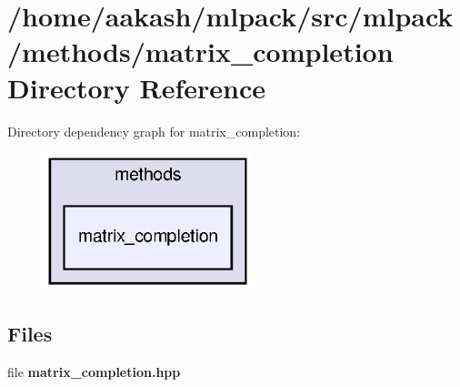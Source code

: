 \section{/home/aakash/mlpack/src/mlpack/methods/matrix\+\_\+completion Directory Reference}
\label{dir_132206e4f3eb299a76e39a3cdd5fd682}
Directory dependency graph for matrix\+\_\+completion\+:
\nopagebreak
\begin{figure}[H]
\begin{center}
\leavevmode
\includegraphics[width=172pt]{dir_132206e4f3eb299a76e39a3cdd5fd682_dep}
\end{center}
\end{figure}
\subsection*{Files}
\begin{DoxyCompactItemize}
\item 
file \textbf{ matrix\+\_\+completion.\+hpp}
\end{DoxyCompactItemize}
